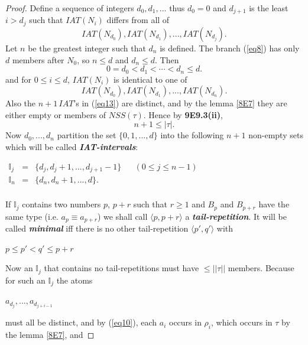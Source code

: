 \documentclass[a4paper,10pt]{article}
\begin{document}
\begin{lem}
\begin{proof}
Define a sequence of integers $d_0, d_1, ...$ thus $d_0 = 0$ and $d_{j+1}$ is the least $i > d_j$ such that $IAT(N_i)$
differs from all of
\begin{equation}\label{eq11}
 IAT(N_{d_0}), IAT(N_{d_1}), ..., IAT(N_{d_j}).
\end{equation}
Let $n$ be the greatest integer such that $d_n$ is defined. The branch (\ref{eq8}) has only $d$ members after $N_0$, 
so $n \leq d$ and $d_n \leq d$. Then
\begin{equation}\label{eq12}
 0 = d_0 < d_1 < \cdots < d_n \leq d.
\end{equation}
and for $0 \leq i \leq d$, $IAT(N_i)$ is identical to one of
\begin{equation}\label{eq13}
 IAT(N_{d_0}), IAT(N_{d_1}), ..., IAT(N_{d_n}).
\end{equation}
Also the $n+1 \,IAT$'s in (\ref{eq13}) are distinct, and by the lemma \ref{8E7} they are either empty or members of $NSS(\tau)$.
Hence by \textbf{9E9.3(ii)},
\begin{equation}\label{eq14}
 n + 1 \leq |\tau|.
\end{equation}
Now $d_0, ..., d_n$ partition the set $\{0, 1, ..., d\}$ into the following $n + 1$ non-empty sets which will be called
\textbf{\em IAT-intervals}:
\begin{center}
$
\begin{array}{lllll}
\mathbb{I}_j & = & \{d_j, d_j + 1, ...,  d_{j + 1} - 1\} & & (0 \leq j \leq n - 1)\\
\mathbb{I}_n & = & \{d_n, d_n + 1, ..., d\} .\\
\end{array}
$
\end{center}
If $\mathbb{I}_j$  contains two numbers $p$, $p + r$ such that $r \geq 1$ and $B_p$  and $B_{p + r}$ have the same type
(i.e. $a_p \equiv a_{p+r}$) we shall call $\langle p, p + r\rangle$ a \textbf{\em tail-repetition}. It will be called
\textbf{\em minimal} iff there is no other tail-repetition $\langle p', q'\rangle$ with 
\begin{center}
 $p \leq p' < q' \leq p + r$ 
\end{center}
Now an $\mathbb{I}_j$ that contains no tail-repetitions must have $\leq ||\tau||$ members. Because for such an $\mathbb{I}_j$ the atoms
\begin{center}
 $a_{d_j}, ..., a_{d_{j+i-1}}$
\end{center}
must all be distinct, and by (\ref{eq10}), each $a_i$ occurs in $\rho_i$, which occurs in $\tau$ by the lemma \ref{8E7}, and 

\end{proof}
\end{lem}
\end{document}
